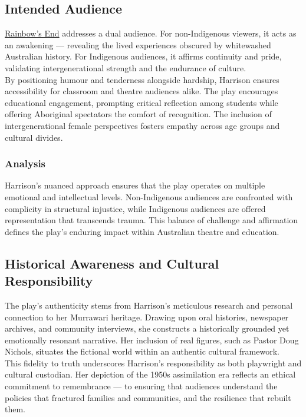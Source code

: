 \documentclass[a4paper]{article}
\begin{document}
\subsection{Intended Audience}
\underline{Rainbow's End} addresses a dual audience. For non-Indigenous viewers, it acts as an awakening — revealing the lived experiences obscured by whitewashed Australian history. For Indigenous audiences, it affirms continuity and pride, validating intergenerational strength and the endurance of culture.\\

By positioning humour and tenderness alongside hardship, Harrison ensures accessibility for classroom and theatre audiences alike. The play encourages educational engagement, prompting critical reflection among students while offering Aboriginal spectators the comfort of recognition. The inclusion of intergenerational female perspectives fosters empathy across age groups and cultural divides.\\

\subsubsection{Analysis}
Harrison’s nuanced approach ensures that the play operates on multiple emotional and intellectual levels. Non-Indigenous audiences are confronted with complicity in structural injustice, while Indigenous audiences are offered representation that transcends trauma. This balance of challenge and affirmation defines the play’s enduring impact within Australian theatre and education.\\

\subsection{Historical Awareness and Cultural Responsibility}
The play’s authenticity stems from Harrison’s meticulous research and personal connection to her Murrawari heritage. Drawing upon oral histories, newspaper archives, and community interviews, she constructs a historically grounded yet emotionally resonant narrative. Her inclusion of real figures, such as Pastor Doug Nichols, situates the fictional world within an authentic cultural framework.\\

This fidelity to truth underscores Harrison’s responsibility as both playwright and cultural custodian. Her depiction of the 1950s assimilation era reflects an ethical commitment to remembrance — to ensuring that audiences understand the policies that fractured families and communities, and the resilience that rebuilt them.\\
\end{document}
